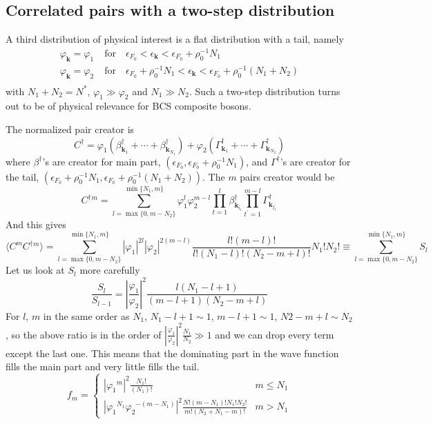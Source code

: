 \documentclass[aps,prb,preprint,groupedaddress,amsmath]{revtex4-1}
\newcommand{\vk}{\ensuremath{\mathbf{k}}}
\newcommand{\dg}{\ensuremath{\dagger}}
\begin{document}
\subsection{Correlated pairs with a two-step distribution}
A third distribution of physical interest is a flat distribution with a tail, namely
\begin{equation}
 \begin{split}
  \varphi_\vk=\varphi_1&\; \mbox{for}\quad{}\epsilon_{F_0}<\epsilon_\vk<\epsilon_{F_0}+\rho_0^{-1}N_1\\
  \varphi_\vk=\varphi_2&\; \mbox{for}\quad{}\epsilon_{F_0}+\rho_0^{-1}N_1<\epsilon_\vk<\epsilon_{F_0}+\rho_0^{-1}(N_1+N_2)\\
 \end{split}
\end{equation}
with $N_1+N_2=N^*$, $\varphi_1\gg\varphi_2$ and $N_1\gg{}N_2$. Such a two-step distribution turns out to be of physical relevance for BCS composite bosons. 

The normalized pair creator is
\begin{equation}
C^\dg=\varphi_1(\beta^\dg_{\vk_1}+\cdots+\beta^\dg_{\vk_{N_1}})+\varphi_2(\Gamma^\dg_{\vk_{1}}+\cdots+\Gamma^\dg_{\vk_{N_2}})
\end{equation}
where $\beta^\dg$'s are creator for main part, $(\epsilon_{F_0},\epsilon_{F_0}+\rho_0^{-1}N_1)$, and $\Gamma^\dg$'s are creator for the tail, $(\epsilon_{F_0}+\rho_0^{-1}N_1,\epsilon_{F_0}+\rho_0^{-1}(N_1+N_2))$.
The $m$ pairs creator would be 
\begin{equation}
C^\dg{}^m=\sum_{l=\max\{0,m-N_2\}}^{\min\{N_1,m\}}\varphi_1^l\varphi_2^{m-l}\prod_{t=1}^{l}\beta^\dg_{\vk_{i_t}}\prod_{t^\prime=1}^{m-l}\Gamma^\dg_{\vk_{j_{t^\prime}}}
\end{equation}
And this gives
\begin{equation}
\langle{}C^mC^\dg{}^m\rangle=\sum_{l=\max\{0,m-N_2\}}^{\min\{N_1,m\}}|\varphi_1|^{2l}|\varphi_2|^{2(m-l)}
\frac{l!(m-l)!}{l!(N_1-l)!(N_2-m+l)!}N_1!N_2!\equiv\sum_{l=\max\{0,m-N_2\}}^{\min\{N_1,m\}}S_l
\end{equation}
Let us look at $S_l$ more carefully
\begin{equation}
\frac{S_l}{S_{l-1}}=\left|\frac{\varphi_1}{\varphi_2}\right|^2\frac{l(N_1-l+1)}{(m-l+1)(N_2-m+l)}
\end{equation}
For $l$, $m$ in the same order as $N_1$, $N_1-l+1\sim1$, $m-l+1\sim1$, $N2-m+l\sim{N_2}$, so the above ratio is in the order of $\left|\frac{\varphi_1}{\varphi_2}\right|^2\frac{N_1}{N_2}\gg1$ and we can drop every term except the last one. This means that the dominating part in the wave function fills the main part and very little fills the tail.  
\begin{equation}
f_m=
\begin{cases}
\left|{\varphi_1}^{m}\right|^2\frac{N_1!}{(N_1)!}&m\leq{}N_1\\
\left|{\varphi_1}^{N_1}{\varphi_2}^{-(m-N_1)}\right|^2\frac{N!(m-N_1)!N_1!N_2!}{m!(N_2+N_1-m)!}&m>N_1
\end{cases}
\end{equation}
\end{document}
